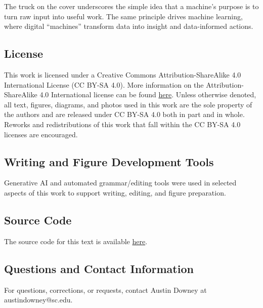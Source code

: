 \documentclass[12pt,letter]{article}
\begin{document}
The truck on the cover underscores the simple idea that a machine's purpose is to turn raw input into useful work. The same principle drives machine learning, where digital ``machines'' transform data into insight and data-informed actions.



\vspace{-0.5ex}
\subsection{License}
\vspace{-1ex}
This work is licensed under a Creative Commons Attribution-ShareAlike 4.0 International License (CC BY-SA 4.0). More information on the Attribution-ShareAlike 4.0 International license can be found 
\href{https://creativecommons.org/licenses/by-sa/4.0/}{here}.
Unless otherwise denoted, all text, figures, diagrams, and photos used in this work are the sole property of the authors and are released under CC BY-SA 4.0 both in part and in whole. Reworks and redistributions of this work that fall within the CC BY-SA 4.0 licenses are encouraged.

\vspace{-0.5ex}
\subsection{Writing and Figure Development Tools}
\vspace{-1ex}
Generative AI and automated grammar/editing tools were used in selected aspects of this work to support writing, editing, and figure preparation.

\vspace{-0.5ex}
\subsection{Source Code}
\vspace{-1ex}
The source code for this text is available 
\href{https://github.com/austindowney/Machine-Learning-for-Engineering-Problem-Solving}{here}.




\subsection{Questions and Contact Information}
\vspace{-1ex}
For questions, corrections, or requests, contact Austin Downey at austindowney@sc.edu.
\end{document}
